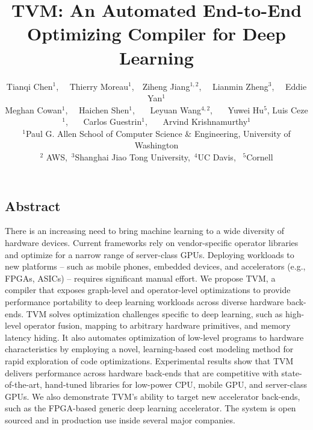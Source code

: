 \documentclass[letterpaper,twocolumn,10pt]{article}
\newcommand{\TensorOpt}{TVM\xspace}
\newcommand{\TensorOptno}{TVM}
\begin{document}
\date{}

\title{TVM: An Automated End-to-End Optimizing Compiler for Deep Learning}

\author{
  \small{
  Tianqi Chen$ ^1$, \ \  Thierry Moreau$ ^1$,\ \ Ziheng Jiang$ ^{1, 2}$, \ \  Lianmin Zheng$ ^{3}$, \ \ Eddie Yan$ ^1$\\
  Meghan Cowan$ ^1$, \ \ Haichen Shen$ ^1$, \ \ \  Leyuan Wang$ ^{4, 2}$, \ \ \  Yuwei Hu$ ^5$,
  Luis Ceze$ ^1$, \ \ \  Carlos Guestrin$ ^1$, \ \ \ Arvind Krishnamurthy$ ^1$}

  \small{$ ^1$Paul G. Allen School of Computer Science \& Engineering, University of Washington}\\
  \small{$ ^2$ AWS,\ $ ^3$Shanghai Jiao Tong University,\ $ ^4$UC Davis, \ $ ^5$Cornell}
}
\maketitle



\subsection*{Abstract}
There is an increasing need to bring machine learning to a wide diversity of hardware devices.
Current frameworks rely on vendor-specific operator libraries and optimize for a narrow range of server-class GPUs.  Deploying workloads to new platforms -- such as mobile phones, embedded devices, and accelerators (e.g., FPGAs, ASICs) -- requires significant manual effort.  We propose \TensorOptno, a compiler that exposes graph-level and operator-level optimizations to provide performance portability to deep learning workloads across diverse hardware back-ends.  \TensorOpt solves optimization challenges specific to deep learning, such as high-level operator fusion, mapping to arbitrary hardware primitives, and memory latency hiding. It also automates optimization of low-level programs to hardware characteristics by employing a novel, learning-based cost modeling method for rapid exploration of code optimizations.
Experimental results show that \TensorOpt delivers performance across hardware back-ends that are competitive with state-of-the-art, hand-tuned libraries for low-power CPU, mobile GPU, and server-class GPUs.
We also demonstrate \TensorOptno's ability to target new accelerator back-ends, such as the FPGA-based generic deep learning accelerator.
The system is open sourced and in production use inside several major companies.
\end{document}
